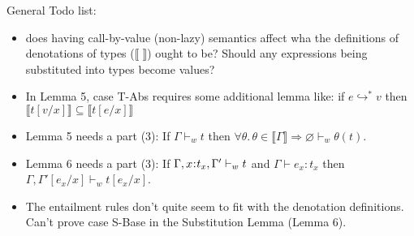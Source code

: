 \documentclass[11pt]{article}
\newtheorem{theorem}{Theorem}%
\newcommand{\bind}{\hspace{0.05em}{:}\hspace{0.05em}} %
\newcommand{\lb}{\llbracket}         %
\newcommand{\rb}{\rrbracket}         %
\newcommand{\many}{\hookrightarrow^*}
\newcommand{\foralltheta}{\forall\theta.\,\theta\in\lb\Gamma\rb}
\newcommand{\letin}[3]{{\tt let}\,#1\hspace{0.1em}{=}\hspace{0.1em}#2\,{\tt in}\,#3}
\begin{document}
\begin{comment}
First, consider $e_1 \equiv c$, then by the definitions of constants $e \equiv c\, v \hookrightarrow \delta(c,v)$.
Second, consider $e_1 \equiv \lambda x.e_2$. Then by the operational semantics, $\lambda x.e_2 \; v \hookrightarrow e_2[v/x]$.
Finally, consider $e_1$ not a value. Then by the inductive hypothesis there exists $e'_1$ such that $e_1 \hookrightarrow e'_1$. By the operational semantics, $e_1\; v \hookrightarrow e_2\; v$.

{\bf Case} {\sc Chk-Syn}: We have $\varnothing \vdash e : t$. By inversion, $\varnothing e : s$ and $\varnothing s <: t$ for some type $s$. By the inductive hypothesis, either $e$ is a value or there exists $e'$ such that $e \hookrightarrow e'$ and we are done.

{\bf Case} {\sc Chk-Lam}: This case holds trivially because $e \equiv \lambda x.e_1$ is a value.

{\bf Case} {\sc Chk-Let}: We have $\varnothing \vdash e : t$ where
$e \equiv (\letin{x}{e_1}{e_2})$ and $t \equiv t_2$. By the operational semantics, we have $e \hookrightarrow e_2[e_1/x]$.
\end{proof}
\end{comment}
\newpage
General Todo list:
\begin{itemize}
	\item does having call-by-value (non-lazy) semantics affect wha the definitions of denotations of types ($\lb \; \rb$) ought to be? Should any expressions being substituted into types become values?
	\item In Lemma 5, case {\sc T-Abs} requires some additional lemma like: if $e \many v$ then $\lb t[v/x] \rb \subseteq \lb t[e/x] \rb$
	\item Lemma 5 needs a part (3): If $\Gamma \vdash_w t$ then $\foralltheta \Rightarrow \varnothing \vdash_w \theta(t)$.
	\item Lemma 6 needs a part (3): If $\Gamma, x\bind t_x, \Gamma' \vdash_w t$ and $\Gamma \vdash e_x : t_x$ then $\Gamma, \Gamma'[e_x/x] \vdash_w t[e_x/x]$.
	\item The entailment rules don't quite seem to fit with the denotation definitions. Can't prove case {\sc S-Base} in the Substitution Lemma (Lemma 6).
	
\end{itemize}
\end{document}
